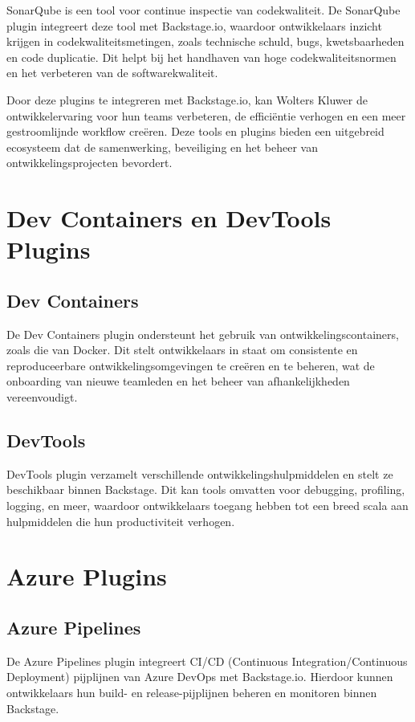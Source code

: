SonarQube is een tool voor continue inspectie van codekwaliteit. De SonarQube plugin integreert deze tool met Backstage.io, waardoor ontwikkelaars inzicht krijgen in codekwaliteitsmetingen, zoals technische schuld, bugs, kwetsbaarheden en code duplicatie. Dit helpt bij het handhaven van hoge codekwaliteitsnormen en het verbeteren van de softwarekwaliteit.

Door deze plugins te integreren met Backstage.io, kan Wolters Kluwer de ontwikkelervaring voor hun teams verbeteren, de efficiëntie verhogen en een meer gestroomlijnde workflow creëren. Deze tools en plugins bieden een uitgebreid ecosysteem dat de samenwerking, beveiliging en het beheer van ontwikkelingsprojecten bevordert.

\section{Dev Containers en DevTools Plugins}

\subsection{Dev Containers}

De Dev Containers plugin ondersteunt het gebruik van ontwikkelingscontainers, zoals die van Docker. Dit stelt ontwikkelaars in staat om consistente en reproduceerbare ontwikkelingsomgevingen te creëren en te beheren, wat de onboarding van nieuwe teamleden en het beheer van afhankelijkheden vereenvoudigt.

\subsection{DevTools}

DevTools plugin verzamelt verschillende ontwikkelingshulpmiddelen en stelt ze beschikbaar binnen Backstage. Dit kan tools omvatten voor debugging, profiling, logging, en meer, waardoor ontwikkelaars toegang hebben tot een breed scala aan hulpmiddelen die hun productiviteit verhogen.

\section{Azure Plugins}

\subsection{Azure Pipelines}

De Azure Pipelines plugin integreert CI/CD (Continuous Integration/Continuous Deployment) pijplijnen van Azure DevOps met Backstage.io. Hierdoor kunnen ontwikkelaars hun build- en release-pijplijnen beheren en monitoren binnen Backstage.

